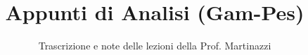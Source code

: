 \documentclass[a4paper,12pt]{article}
\title{Appunti di Analisi (Gam-Pes)}
\author{Trascrizione e note delle lezioni della Prof. Martinazzi}
\date{}
\begin{document}
\maketitle
\projectintro
\tableofcontents
\newpage

\end{document}
